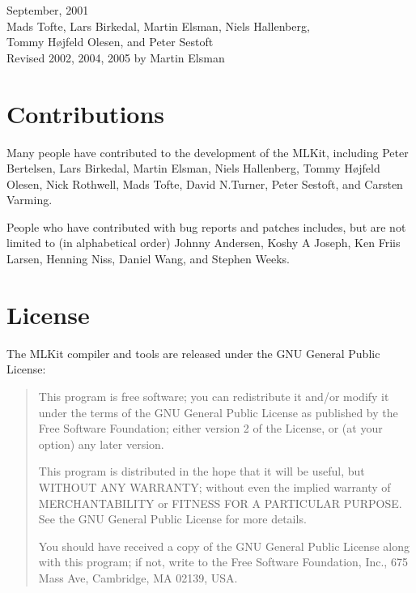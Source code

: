 \documentclass[12pt]{book}
\begin{document}
\begin{flushright}
September, 2001\\[5mm]
Mads Tofte, Lars Birkedal, Martin Elsman, Niels Hallenberg, \\
Tommy H\o jfeld Olesen, and Peter Sestoft \\[5mm]
Revised 2002, 2004, 2005 by Martin Elsman
\end{flushright}

\newpage

\section*{Contributions}
Many people have contributed to the development of the MLKit,
including Peter Bertelsen, Lars Birkedal, Martin Elsman, Niels
Hallenberg, Tommy H\o jfeld Olesen, Nick Rothwell, Mads Tofte, David
N.\@ Turner, Peter Sestoft, and Carsten Varming.

People who have contributed with bug reports and patches includes, but
are not limited to (in alphabetical order) Johnny Andersen, Koshy A
Joseph, Ken Friis Larsen, Henning Niss, Daniel Wang, and Stephen Weeks.

\section*{License}
The MLKit compiler and tools are released under the GNU General Public
License:

{\sc
\begin{quote}
  This program is free software; you can redistribute it and/or
  modify it under the terms of the GNU General Public License as
  published by the Free Software Foundation; either version 2 of the
  License, or (at your option) any later version.
  
  This program is distributed in the hope that it will be useful, but
  WITHOUT ANY WARRANTY; without even the implied warranty of
  MERCHANTABILITY or FITNESS FOR A PARTICULAR PURPOSE.  See the GNU
  General Public License for more details.
  
  You should have received a copy of the GNU General Public License
  along with this program; if not, write to the Free Software
  Foundation, Inc., 675 Mass Ave, Cambridge, MA 02139, USA.
\end{quote}
}
\end{document}
